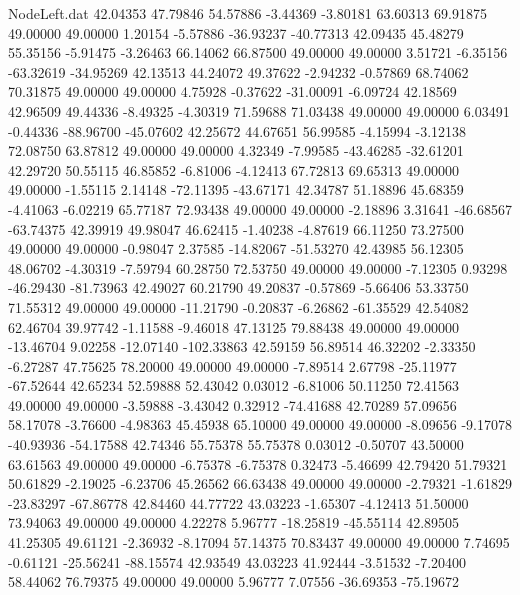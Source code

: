 \begin{filecontents}{NodeLeft.dat}
  42.04353   47.79846   54.57886    -3.44369   -3.80181   63.60313   69.91875   49.00000   49.00000    1.20154   -5.57886  -36.93237  -40.77313
  42.09435   45.48279   55.35156    -5.91475   -3.26463   66.14062   66.87500   49.00000   49.00000    3.51721   -6.35156  -63.32619  -34.95269
  42.13513   44.24072   49.37622    -2.94232   -0.57869   68.74062   70.31875   49.00000   49.00000    4.75928   -0.37622  -31.00091   -6.09724
  42.18569   42.96509   49.44336    -8.49325   -4.30319   71.59688   71.03438   49.00000   49.00000    6.03491   -0.44336  -88.96700  -45.07602
  42.25672   44.67651   56.99585    -4.15994   -3.12138   72.08750   63.87812   49.00000   49.00000    4.32349   -7.99585  -43.46285  -32.61201
  42.29720   50.55115   46.85852    -6.81006   -4.12413   67.72813   69.65313   49.00000   49.00000   -1.55115    2.14148  -72.11395  -43.67171
  42.34787   51.18896   45.68359    -4.41063   -6.02219   65.77187   72.93438   49.00000   49.00000   -2.18896    3.31641  -46.68567  -63.74375
  42.39919   49.98047   46.62415    -1.40238   -4.87619   66.11250   73.27500   49.00000   49.00000   -0.98047    2.37585  -14.82067  -51.53270
  42.43985   56.12305   48.06702    -4.30319   -7.59794   60.28750   72.53750   49.00000   49.00000   -7.12305    0.93298  -46.29430  -81.73963
  42.49027   60.21790   49.20837    -0.57869   -5.66406   53.33750   71.55312   49.00000   49.00000  -11.21790   -0.20837   -6.26862  -61.35529
  42.54082   62.46704   39.97742    -1.11588   -9.46018   47.13125   79.88438   49.00000   49.00000  -13.46704    9.02258  -12.07140 -102.33863
  42.59159   56.89514   46.32202    -2.33350   -6.27287   47.75625   78.20000   49.00000   49.00000   -7.89514    2.67798  -25.11977  -67.52644
  42.65234   52.59888   52.43042     0.03012   -6.81006   50.11250   72.41563   49.00000   49.00000   -3.59888   -3.43042    0.32912  -74.41688
  42.70289   57.09656   58.17078    -3.76600   -4.98363   45.45938   65.10000   49.00000   49.00000   -8.09656   -9.17078  -40.93936  -54.17588
  42.74346   55.75378   55.75378     0.03012   -0.50707   43.50000   63.61563   49.00000   49.00000   -6.75378   -6.75378    0.32473   -5.46699
  42.79420   51.79321   50.61829    -2.19025   -6.23706   45.26562   66.63438   49.00000   49.00000   -2.79321   -1.61829  -23.83297  -67.86778
  42.84460   44.77722   43.03223    -1.65307   -4.12413   51.50000   73.94063   49.00000   49.00000    4.22278    5.96777  -18.25819  -45.55114
  42.89505   41.25305   49.61121    -2.36932   -8.17094   57.14375   70.83437   49.00000   49.00000    7.74695   -0.61121  -25.56241  -88.15574
  42.93549   43.03223   41.92444    -3.51532   -7.20400   58.44062   76.79375   49.00000   49.00000    5.96777    7.07556  -36.69353  -75.19672

\end{filecontents}
